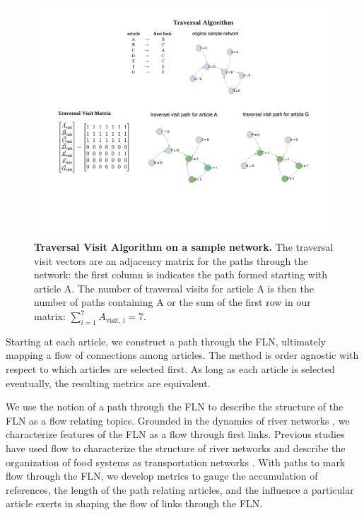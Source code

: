 \documentclass[pre,twocolumn,twoside,superscriptaddress,floatfix, aps, 10pt]{revtex4-1}
\begin{document}
\begin{figure}[tp!]
  \centering	
  \includegraphics[width=\textwidth]{graphics/traversal_visit_algo_figure.pdf}  
  \caption{
    \textbf{Traversal Visit Algorithm on a sample network.}
     The traversal visit vectors are an adjacency matrix for the paths through the network: the first column is indicates the path formed starting with article A. The number of traversal visits for article A is then the number of paths containing A or the sum of the first row in our matrix:
     $\sum_{i=1}^7 A_{\text{visit, i}} = 7$.
  }
  \label{fig:Traversal Visits}
\end{figure}

Starting at each article, we construct a path through the FLN, 
ultimately mapping a flow of connections among articles.
The method is order agnostic with respect to which articles are selected first. As long as each article is selected eventually, the resulting metrics are equivalent.

We use the notion of a path through the FLN to describe 
the structure of the FLN as a flow relating topics. 
Grounded in the dynamics of river networks
\cite{geo_basins},
we characterize features of the FLN as a flow through first links.
Previous studies have used flow to characterize the structure of river networks
\cite{dodds} and describe the organization of food systems as transportation networks
\cite{food_webs}.
With paths to mark flow through the FLN, we develop metrics to 
gauge the accumulation of references, 
the length of the path relating articles, and the influence a particular
article exerts in shaping the flow of links through the FLN.
\end{document}
